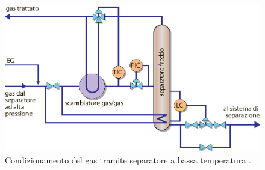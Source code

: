 \begin{figure}[htbp]
    \centering
    \includegraphics[width=.7\textwidth]{fig/impianti/lts.eps}
    \caption{Condizionamento del gas tramite separatore a bassa temperatura \parencite{bianco2005impiantigas}.}
    \label{fig:lts}
\end{figure}


